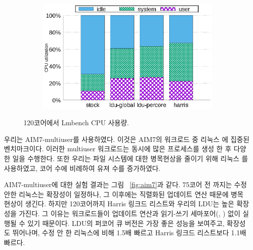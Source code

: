 \begin{figure}[tb]
    \centering
    \begin{subfigure}[b]{1\textwidth}
  \begin{center}
        \includegraphics[scale=0.7]{graph/lmbench_cpuutils.eps}
  \end{center}
    \end{subfigure}
        \centering
    \caption{120코어에서 Lmbench CPU 사용량.}
    \label{fig:utilization_lmbench}
    
\end{figure}



우리는 AIM7-multiuser를 사용하였다. 
이것은 AIM7의 워크로드 중 리눅스 에 집중된 벤치마크이다. 
이러한 multiuser 워크로드는 동시에 많은 프로세스를 생성 한 후 다양한 
일을 수행한다. 
또한 우리는 파일 시스템에 대한 병목현상을 줄이기 위해 리눅스 를 사용하였고, 
코어 수에 비례하여 유져 수를 증가하였다.
 
AIM7-multiuser에 대한 실험 결과는 그림 ~\ref{fig:aim7}과 같다.
75코어 전 까지는 수정 안한 리눅스는 확장성이 일정하나, 그 이후에는 직렬화된 업데이트 
연산 때문에 병목 현상이 생긴다. 
하지만 120코어까지 Harris 링크드 리스트와 우리의 LDU는 높은 확장성을 가진다.
그 이유는 워크로드들이 업데이트 연산과 읽기-쓰기 세마포어(,
) 없이 실행될 수 있기 때문이다.
LDU의 퍼코어 큐 버전은 가장 좋은 성능을 보여주고, 확장성도 뛰어나며, 
수정 안 한 리눅스에 비해 1.5배 빠르고 Harris 링크드 리스트보다 1.1배 빠르다.


